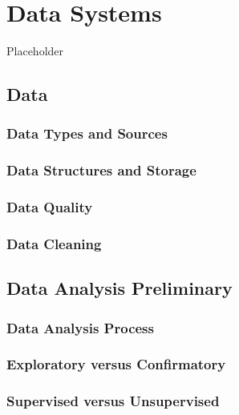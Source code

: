 \documentclass[]{book}
\theoremstyle{definition}
\theoremstyle{definition}
\theoremstyle{definition}
\theoremstyle{remark}
\begin{document}
\chapter{Data Systems}\label{C:DataSystems}

Placeholder

\section{Data}\label{data}

\subsection{Data Types and Sources}\label{data-types-and-sources}

\subsection{Data Structures and
Storage}\label{data-structures-and-storage}

\subsection{Data Quality}\label{data-quality}

\subsection{Data Cleaning}\label{data-cleaning}

\section{Data Analysis Preliminary}\label{data-analysis-preliminary}

\subsection{Data Analysis Process}\label{S:process}

\subsection{Exploratory versus
Confirmatory}\label{exploratory-versus-confirmatory}

\subsection{Supervised versus
Unsupervised}\label{supervised-versus-unsupervised}
\end{document}
